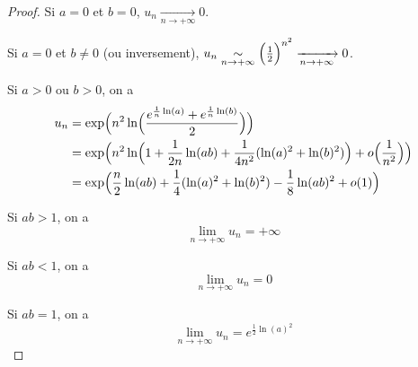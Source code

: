 \documentclass[12pt]{article}
\begin{document}
\begin{proof}
	Si $a=0$ et $b=0$, $u_{n}\xrightarrow[n\to+\infty]{}0$.

	Si $a=0$ et $b\neq0$ (ou inversement), $u_{n}\underset{n\to+\infty}{\sim}\Bigl(\frac{1}{2}\Bigr)^{n^{2}}\xrightarrow[n\to+\infty]{}0$.

	Si $a>0$ ou $b>0$, on a
	\begin{align*}
		u_{n}
		&=\exp\Bigl(n^{2}\ln\Bigl(\frac{e^{\frac{1}{n}\ln(a)}+e^{\frac{1}{n}\ln(b)}}{2}\Bigr)\Bigr)\\
		&=\exp\Bigl(n^{2}\ln\Bigl(1+\frac{1}{2n}\ln(ab)+\frac{1}{4n^2}(\ln(a)^{2}+\ln(b)^{2})\Bigr)+o\Bigl(\frac{1}{n^{2}}\Bigr)\Bigr)\\
		&=\exp\Bigl(\frac{n}{2}\ln(ab)+\frac{1}{4}(\ln(a)^{2}+\ln(b)^{2})-\frac{1}{8}\ln(ab)^2+o(1)\Bigr)
	\end{align*}

	Si $ab>1$, on a 
	\begin{equation*}\boxed{\lim\limits_{n\to+\infty} u_{n}=+\infty}\end{equation*}
	
	Si $ab<1$, on a 
	\begin{equation*}\boxed{\lim\limits_{n\to+\infty} u_{n}=0}\end{equation*}

	Si $ab=1$, on a 
	\begin{equation*}\boxed{\lim\limits_{n\to+\infty} u_{n}=e^{\frac{1}{2}\ln(a)^{2}}}\end{equation*}
\end{proof}
\end{document}
